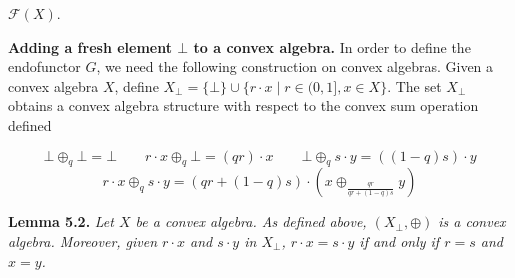\documentclass[11pt,a4paper]{amsart}
\begin{document}
\hypertarget{html:S5.SS0.SSS0.P0.SPx2.p2.m12}{}\({{\mathcal{F}}(X)}\).
\par\medskip
\hypertarget{html:S5.SS0.SSS0.P0.SPx3}{} \par\noindent\textbf{Adding a fresh element %
\hypertarget{html:S5.SS0.SSS0.P0.SPx3.m1}{}\({\bot}\) to a convex algebra.}\quad  %
\hypertarget{html:S5.SS0.SSS0.P0.SPx3.p1}{} In order to define the endofunctor %
\hypertarget{html:S5.SS0.SSS0.P0.SPx3.p1.m1}{}\({G}\), we need the following construction on convex algebras. Given a convex algebra %
\hypertarget{html:S5.SS0.SSS0.P0.SPx3.p1.m2}{}\({X}\), define %
\hypertarget{html:S5.SS0.SSS0.P0.SPx3.p1.m3}{}\({X_{\bot}=\{\bot\}\cup\{r\cdot x\mid r\in(0,1],x\in X\}}\). The set %
\hypertarget{html:S5.SS0.SSS0.P0.SPx3.p1.m4}{}\({X_{\bot}}\) obtains a convex algebra structure with respect to the convex sum operation defined
\par\medskip
\hypertarget{html:S8.EGx6}{} %
\hypertarget{html:S5.Ex1}{}  %
\hypertarget{html:S5.Ex1.m1}{}\[\displaystyle\bot\oplus_{q}\bot=\bot\qquad r\cdot x\oplus_{q}\bot=(qr)\cdot x\qquad\bot\oplus_{q}s\cdot y=((1-q)s)\cdot y\]   %
\hypertarget{html:S5.Ex2}{}  %
\hypertarget{html:S5.Ex2.m1}{}\[\displaystyle r\cdot x\oplus_{q}s\cdot y=(qr+(1-q)s)\cdot(x\oplus_{\frac{qr}{qr+(1-q)s}}y)\]     %
\hypertarget{html:S5.Thmtheorem2}{} \par\noindent\textbf{\textbf{Lemma 5.2}\textbf{.}}\quad  %
\hypertarget{html:S5.Thmtheorem2.p1}{} \emph{Let %
\hypertarget{html:S5.Thmtheorem2.p1.m1}{}\({X}\) be a convex algebra. As defined above, %
\hypertarget{html:S5.Thmtheorem2.p1.m2}{}\({(X_{\bot},\oplus)}\) is a convex algebra. Moreover, given %
\hypertarget{html:S5.Thmtheorem2.p1.m3}{}\({r\cdot x}\) and %
\hypertarget{html:S5.Thmtheorem2.p1.m4}{}\({s\cdot y}\) in %
\hypertarget{html:S5.Thmtheorem2.p1.m5}{}\({X_{\bot}}\), %
\hypertarget{html:S5.Thmtheorem2.p1.m6}{}\({r\cdot x=s\cdot y}\) if and only if %
\hypertarget{html:S5.Thmtheorem2.p1.m7}{}\({r=s}\) and %
\hypertarget{html:S5.Thmtheorem2.p1.m8}{}\({x=y}\).}
\end{document}

